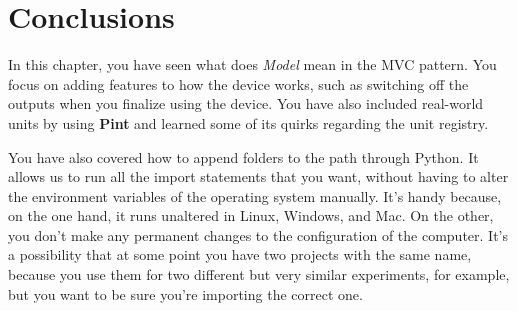 \section{Conclusions}\label{sec:device-model-conclusions2}
In this chapter, you have seen what does \emph{Model} mean in the {MVC} pattern. You focus on adding features to how the device works, such as switching off the outputs when you finalize using the device. You have also included real-world units by using \textbf{Pint} and learned some of its quirks regarding the unit registry.

You have also covered how to append folders to the path through Python. It allows us to run all the import statements that you want, without having to alter the environment variables of the operating system manually. It's handy because, on the one hand, it runs unaltered in Linux, Windows, and Mac. On the other, you don't make any permanent changes to the configuration of the computer. It's a possibility that at some point you have two projects with the same name, because you use them for two different but very similar experiments, for example, but you want to be sure you're importing the correct one.
